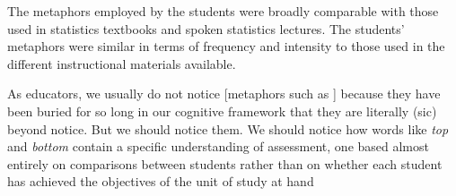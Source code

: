 The metaphors employed by the students were broadly comparable with
those used in statistics textbooks and spoken statistics lectures.
The students' metaphors were similar in terms of frequency and
intensity to those used in the different instructional materials
available.

\vfill

\begin{singlespace}
\setlength{\epigraphwidth}{.7\textwidth} %
\epigraph{As educators, we usually do not notice [metaphors such as
    ] because they have been buried for so long in
  our cognitive framework that they are literally (sic) beyond notice.
  But we should notice them.  We should notice how words like
  \emph{top} and \emph{bottom} contain a specific understanding of
  assessment, one based almost entirely on comparisons between
  students rather than on whether each student has achieved the
  objectives of the unit of study at hand}{\cite[p6]{badley2012}}
\end{singlespace}
